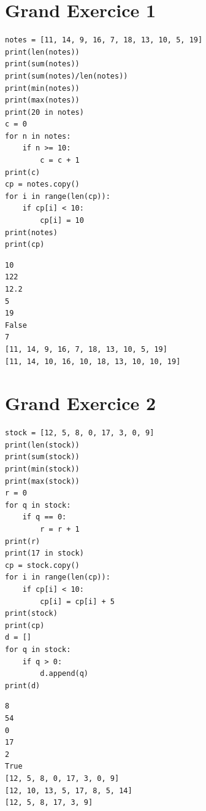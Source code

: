 \documentclass[12pt,a4paper]{article}
\begin{document}
\section*{Grand Exercice 1}
\begin{lstlisting}[style=pythonstyle]
notes = [11, 14, 9, 16, 7, 18, 13, 10, 5, 19]
print(len(notes))
print(sum(notes))
print(sum(notes)/len(notes))
print(min(notes))
print(max(notes))
print(20 in notes)
c = 0
for n in notes:
    if n >= 10:
        c = c + 1
print(c)
cp = notes.copy()
for i in range(len(cp)):
    if cp[i] < 10:
        cp[i] = 10
print(notes)
print(cp)
\end{lstlisting}
\begin{lstlisting}[style=terminalstyle]
10
122
12.2
5
19
False
7
[11, 14, 9, 16, 7, 18, 13, 10, 5, 19]
[11, 14, 10, 16, 10, 18, 13, 10, 10, 19]
\end{lstlisting}

\section*{Grand Exercice 2}
\begin{lstlisting}[style=pythonstyle]
stock = [12, 5, 8, 0, 17, 3, 0, 9]
print(len(stock))
print(sum(stock))
print(min(stock))
print(max(stock))
r = 0
for q in stock:
    if q == 0:
        r = r + 1
print(r)
print(17 in stock)
cp = stock.copy()
for i in range(len(cp)):
    if cp[i] < 10:
        cp[i] = cp[i] + 5
print(stock)
print(cp)
d = []
for q in stock:
    if q > 0:
        d.append(q)
print(d)
\end{lstlisting}
\begin{lstlisting}[style=terminalstyle]
8
54
0
17
2
True
[12, 5, 8, 0, 17, 3, 0, 9]
[12, 10, 13, 5, 17, 8, 5, 14]
[12, 5, 8, 17, 3, 9]
\end{lstlisting}
\end{document}
